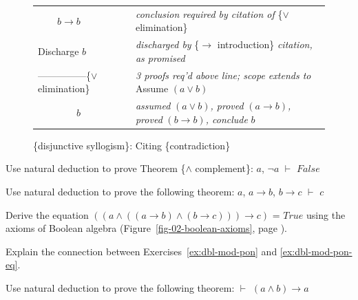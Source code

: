 {{\begin{figure}
\begin{center}
\begin{tabular}{ll}
~~~~$b \rightarrow b$ &\emph{conclusion required by citation of} \{$\vee$ elimination\}\\
Discharge $b$              & \emph{discharged by} \{$\rightarrow$ introduction\} \emph{citation, as promised}\\
---------------\{$\vee$ elimination\}       &\emph{3 proofs req'd above line; scope extends to} Assume $(a \vee b)$\\
~~~~~~~~$b$        &\emph{assumed} $(a \vee b)$\emph{, proved} $(a \rightarrow b)$\emph{, proved} $(b \rightarrow b)$\emph{, conclude }$b$\\
\end{tabular}
\end{center}
\caption{\{disjunctive syllogism\}: Citing \{contradiction\}}
\label{fig:disjunctive-syllogism-nd}
\end{figure}

\begin{ExerciseList}

\Exercise
\label{thm:and-complement}
Use natural deduction to prove
Theorem
\{$\wedge$ complement\}: $a$, $\neg a$ $\vdash$ $False$

\Exercise
\label{ex:dbl-mod-pon}
Use natural deduction to prove the following theorem:
$a$, $a \rightarrow b$, $b \rightarrow c$ $\vdash$ $c$

\Exercise
\label{ex:dbl-mod-pon-eq}
Derive the equation
$((a \wedge ((a \rightarrow b) \wedge (b \rightarrow c))) \rightarrow c)$ = $True$
using the axioms of Boolean algebra
(Figure~\ref{fig-02-boolean-axioms}, page \pageref{fig-02-boolean-axioms}).

\Exercise
Explain the connection between
Exercises~\ref{ex:dbl-mod-pon} and \ref{ex:dbl-mod-pon-eq}.

\Exercise
Use natural deduction to prove the following theorem:
$\vdash$ $(a \wedge b) \rightarrow a$


\end{ExerciseList}}}
